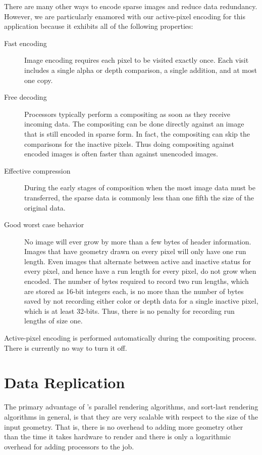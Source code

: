 There are many other ways to encode sparse images and reduce data
redundancy.  However, we are particularly enamored with our active-pixel
encoding for this application because it exhibits all of the following
properties:

\begin{description}
\item[Fast encoding]  Image encoding requires each pixel to be visited
  exactly once.  Each visit includes a single alpha or depth comparison, a
  single addition, and at most one copy.
\item[Free decoding]  Processors typically perform a compositing as
  soon as they receive incoming data.  The compositing can be done
  directly against an image that is still encoded in sparse form.  In fact,
  the compositing can skip the comparisons for the inactive pixels.
  Thus doing compositing against encoded images is often faster than
  against unencoded images.
\item[Effective compression]  During the early stages of composition when
  the most image data must be transferred, the sparse data is commonly less
  than one fifth the size of the original data.
\item[Good worst case behavior] No image will ever grow by more than a few
  bytes of header information.  Images that have geometry drawn on every
  pixel will only have one run length.  Even images that alternate between
  active and inactive status for every pixel, and hence have a run length
  for every pixel, do not grow when encoded.  The number of bytes required
  to record two run lengths, which are stored as 16-bit integers each, is
  no more than the number of bytes saved by not recording either color or
  depth data for a single inactive pixel, which is at least 32-bits.  Thus,
  there is no penalty for recording run lengths of size one.
\end{description}

Active-pixel encoding is performed automatically during the compositing
process.  There is currently no way to turn it off.


\section{Data Replication}
\label{sec:Customizing_Compositing:Data_Replication}

The primary advantage of \IceT's parallel rendering algorithms, and
sort-last rendering algorithms in general, is that they are very scalable
with respect to the size of the input geometry.  That is, there is no
overhead to adding more geometry other than the time it takes hardware to
render and there is only a logarithmic overhead for adding processors to
the job.

